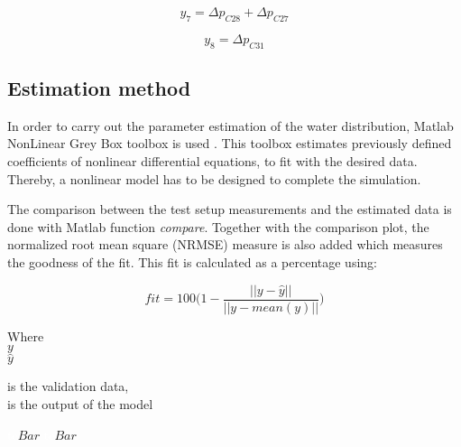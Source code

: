 \vspace{4mm}
\begin {equation}
   y_7 = \Delta p_{C28} + \Delta p_{C27}
\end{equation}

\vspace{4mm}
\begin {equation}
   y_8 = \Delta p_{C31} 
\end{equation}

 
\subsection{Estimation method} 
\label{MatlabScript}

In order to carry out the parameter estimation of the water distribution, Matlab NonLinear Grey Box toolbox is used \cite{MatlabGreyBox}. This toolbox 
estimates previously defined coefficients of nonlinear differential equations, to fit with the desired data. 
Thereby, a nonlinear model has to be designed to complete the simulation. 

The comparison between the test setup measurements and the estimated data is done with Matlab function \textit{compare}. Together with the comparison 
plot, the normalized root mean square (NRMSE) measure is also added which measures the goodness of the fit. This fit is calculated as a percentage \cite{MatlabFit} using:

\begin{equation}
  fit = 100 \bigg(1 - \frac{||y - \hat{y}||}{||y - mean(y)||}\bigg)
  \label{fitequation}
\end{equation} 

\begin{minipage}[t]{0.20\textwidth}
Where\\
\hspace*{8mm} $y$ \\
\hspace*{8mm} $\hat{y}$ \\
\end{minipage}
\begin{minipage}[t]{0.68\textwidth}
\vspace*{2mm}
is the validation data, \\
is the output of the model\\
\end{minipage}
\begin{minipage}[t]{0.10\textwidth}
\vspace*{2mm}
\textcolor{White}{te}$\unit{Bar}$
\textcolor{White}{te}$\unit{Bar}$
\end{minipage}

